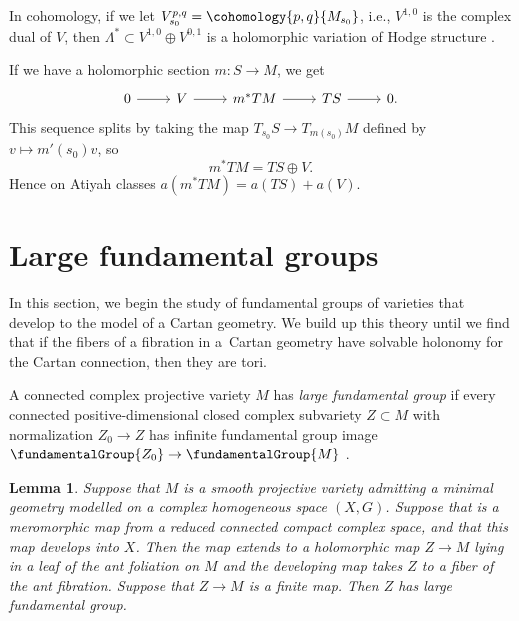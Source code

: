 \documentclass[pdftex]{sigma}
\numberwithin{equation}{section}
\newtheorem{Lemma}[Theorem]{Lemma}
\begin{document}
In cohomology, if we let $V^{p,q}_{s_0} = \cohomology{p,q}{M_{s_0}}$, i.e., $V^{1,0}$ is the complex dual of $V$, then $\Lambda^* \subset V^{1,0} \oplus V^{0,1}$ is a holomorphic variation of Hodge structure \cite[p. 249]{Voisin:2007a}.

If we have a holomorphic section $m \colon S \to M$, we get
\[
\begin{tikzcd}
0 \arrow{r} & V \arrow{r} & m^*TM \arrow{r} & TS \arrow{r} & 0.
\end{tikzcd}
\]
This sequence splits by taking the map $T_{s_0} S \longrightarrow T_{m(s_0)} M$ defined by
$v \longmapsto m'(s_0)v$, so
\[
m^* TM = TS \oplus V.
\]
Hence on Atiyah classes $a(m^*TM) = a(TS)+a(V)$.

\section{Large fundamental groups}\label{section:Large.fundamental.groups}
In this section, we begin the study of fundamental groups of varieties that develop to the model of a Cartan geometry.
We build up this theory until we find that if the fibers of a fibration in a~Cartan geometry have solvable holonomy for the Cartan connection, then they are tori.

A connected complex projective variety $M$ has \emph{large fundamental group} if every connected positive-dimensional closed
complex subvariety $Z \subset M$ with normalization $Z_0 \to Z$ has infinite fundamental group image $\fundamentalGroup{Z_0} \to \fundamentalGroup{M}$ \cite{Kollar:1993}.

\begin{Lemma}\label{lemma:dev.large}
Suppose that $M$ is a smooth projective variety admitting a minimal geometry modelled on a complex homogeneous space $(X, G)$.
Suppose that  is a meromorphic map from a reduced connected compact complex space, and that this map develops into $X$.
Then the map extends to a holomorphic map $Z \to M$ lying in a leaf of the ant foliation on $M$ and the developing map takes $Z$ to a fiber of the ant fibration.
Suppose that $Z \to M$ is a finite map.
Then $Z$ has large fundamental group.
\end{Lemma}
\end{document}
